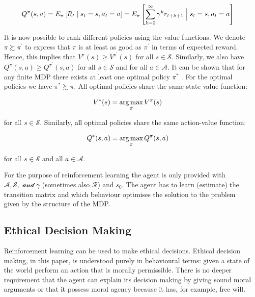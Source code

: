 \begin{equation}
    Q^\pi (s,a) = E_\pi \left[ R_t \mid s_t = s, a_t = a \right] = E_\pi \left[ \sum_{k = 0}^\infty \gamma^k r_{t+k+1} \Bigm| s_t = s, a_t = a \right]
\end{equation}
        
It is now possible to rank different policies using the value functions. We denote $\pi \succsim \pi^{\prime}$ to express that $\pi$ is at least as good as $\pi^{\prime}$ in terms of expected reward. Hence, this implies that $V^\pi(s) \geq V^{\pi^{\prime}} (s)$ for all $s \in \mathcal{S}$. Similarly, we also have $Q^\pi (s,a) \geq Q^{\pi^{\prime}} (s,a)$ for all $s \in \mathcal{S}$ and for all $a \in \mathcal{A}$. It can be shown that for any finite MDP there exists at least one optimal policy $\pi^*$ \cite[p.~75f]{sutton1998reinforcement}. For the optimal policies we have $\pi^* \succsim \pi$. All optimal policies share the same state-value function: 

\begin{equation}
    V^*(s) = \operatorname*{arg\,max}_\pi V^\pi(s)
\end{equation}

\noindent for all $s \in \mathcal{S}$. Similarly, all optimal policies share the same action-value function:

\begin{equation}
    Q^*(s,a) = \operatorname*{arg\,max}_\pi Q^\pi(s,a)
\end{equation}

\noindent for all $s \in \mathcal{S}$ and all $a \in \mathcal{A}$.

For the purpose of reinforcement learning the agent is only provided with $\mathcal{A,S,\text{ and }\gamma}$ (sometimes also $\mathcal{R}$) and $s_0$. The agent has to learn (estimate) the transition matrix and which behaviour optimises the solution to the problem given by the structure of the MDP.  

\subsection{Ethical Decision Making}

Reinforcement learning can be used to make ethical decisions. Ethical decision making, in this paper, is understood purely in behavioural terms: given a state of the world perform an action that is morally permissible. There is no deeper requirement that the agent can explain its decision making by giving sound moral arguments or that it possess moral agency because it has, for example, free will.

